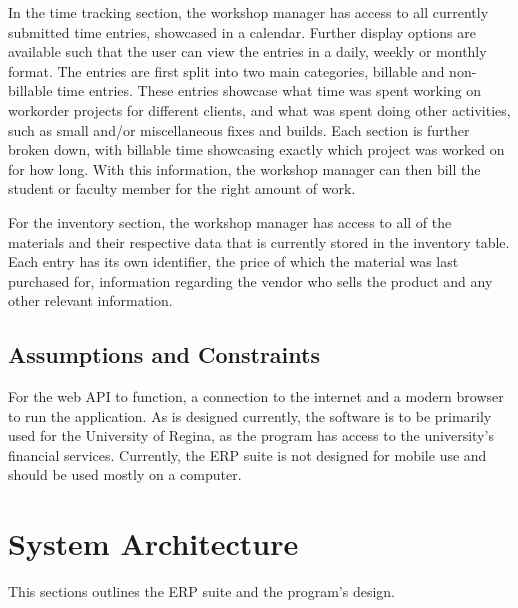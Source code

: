 {{{In the time tracking section, the workshop manager has access to all currently submitted time entries, showcased in a calendar. Further display options are available such that the user can view the entries in a daily, weekly or monthly format. The entries are first split into two main categories, billable and non-billable time entries. These entries showcase what time was spent working on workorder projects for different clients, and what was spent doing other activities, such as small and/or miscellaneous fixes and builds. Each section is further broken down, with billable time showcasing exactly which project was worked on for how long. With this information, the workshop manager can then bill the student or faculty member for the right amount of work. 
\newline
{\setlength{\parindent}{0cm}

For the inventory section, the workshop manager has access to all of the materials and their respective data that is currently stored in the inventory table. Each entry has its own identifier, the price of which the material was last purchased for, information regarding the vendor who sells the product and any other relevant information. 

\subsection{Assumptions and Constraints}
For the web API to function, a connection to the internet and a modern browser to run the application. As is designed currently, the software is to be primarily used for the University of Regina, as the program has access to the university's financial services. Currently, the ERP suite is not designed for mobile use and should be used mostly on a computer. 

\newpage

\section{System Architecture}
This sections outlines the ERP suite and the program's design.


}}}}
